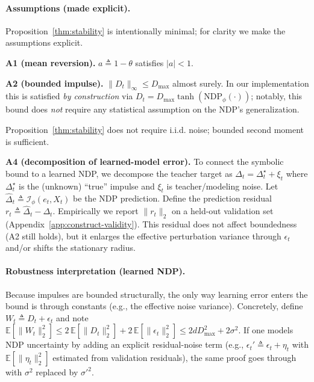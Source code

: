 \documentclass[11pt]{article}
\begin{document}
\paragraph{Assumptions (made explicit).}
Proposition~\ref{thm:stability} is intentionally minimal; for clarity we make the assumptions explicit.

\noindent\textbf{A1 (mean reversion).} $a\triangleq 1-\theta$ satisfies $|a|<1$.

\noindent\textbf{A2 (bounded impulse).} $\|D_t\|_{\infty}\le D_{\max}$ almost surely. In our implementation this is satisfied \emph{by construction} via $D_t=D_{\max}\tanh(\mathrm{NDP}_\phi(\cdot))$; notably, this bound does \emph{not} require any statistical assumption on the NDP's generalization.

Proposition~\ref{thm:stability} does not require i.i.d. noise; bounded second moment is sufficient.

\noindent\textbf{A4 (decomposition of learned-model error).}
To connect the symbolic bound to a learned NDP, we decompose the teacher target as $\Delta_t=\Delta_t^{\star}+\xi_t$ where $\Delta_t^{\star}$ is the (unknown) ``true'' impulse and $\xi_t$ is teacher/modeling noise.
Let $\widehat{\Delta}_t\triangleq \mathcal{I}_\phi(e_t, X_t)$ be the NDP prediction. Define the prediction residual $r_t\triangleq \widehat{\Delta}_t-\Delta_t$.
Empirically we report $\|r_t\|_2$ on a held-out validation set (Appendix~\ref{app:construct-validity}). This residual does not affect boundedness (A2 still holds), but it enlarges the effective perturbation variance through $\epsilon_t$ and/or shifts the stationary radius.

\paragraph{Robustness interpretation (learned NDP).}
Because impulses are bounded structurally, the only way learning error enters the bound is through constants (e.g., the effective noise variance).
Concretely, define $W_t\triangleq D_t+\epsilon_t$ and note
$\mathbb{E}[\|W_t\|_2^2]\le 2\,\mathbb{E}[\|D_t\|_2^2]+2\,\mathbb{E}[\|\epsilon_t\|_2^2]\le 2dD_{\max}^2+2\sigma^2$.
If one models NDP uncertainty by adding an explicit residual-noise term (e.g., $\epsilon_t'\triangleq\epsilon_t+\eta_t$ with $\mathbb{E}[\|\eta_t\|_2^2]$ estimated from validation residuals), the same proof goes through with $\sigma^2$ replaced by $\sigma'^2$.
\end{document}
